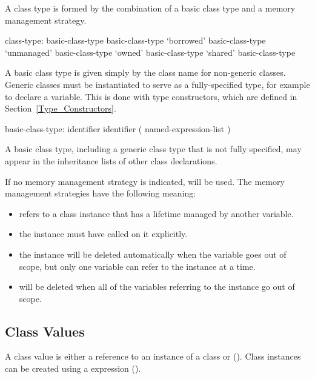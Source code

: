 A class type is formed by the combination of a basic class type and a
memory management strategy.

\begin{syntax}
class-type:
  basic-class-type
  basic-class-type
  `borrowed' basic-class-type
  `unmanaged' basic-class-type
  `owned' basic-class-type
  `shared' basic-class-type
\end{syntax}

A basic class type is given simply by the class name for non-generic classes.
Generic classes must be instantiated to serve as a fully-specified
type, for example to declare a variable.  This is done with
type constructors, which are defined in Section~\ref{Type_Constructors}.

\begin{syntax}
basic-class-type:
  identifier
  identifier ( named-expression-list )
\end{syntax}

A basic class type, including a generic class type that is not
fully specified, may appear in the inheritance lists
of other class declarations.

If no memory management strategy is indicated,  will be
used. The memory management strategies have the following meaning:

\begin{itemize}
  \item {} refers to a class instance that has a lifetime
    managed by another variable.
  \item {} the instance must have  called on it explicitly.
  \item {} the instance will be deleted
    automatically when the  variable goes out of scope, but
    only one  variable can refer to the instance at a time.
  \item {} will be deleted when all of the 
    variables referring to the instance go out of scope.
\end{itemize}


\subsection{Class Values}
\label{Class_Values}

A class value is either a reference to an instance of a class
or  (). Class instances can be created
using a  expression ().

